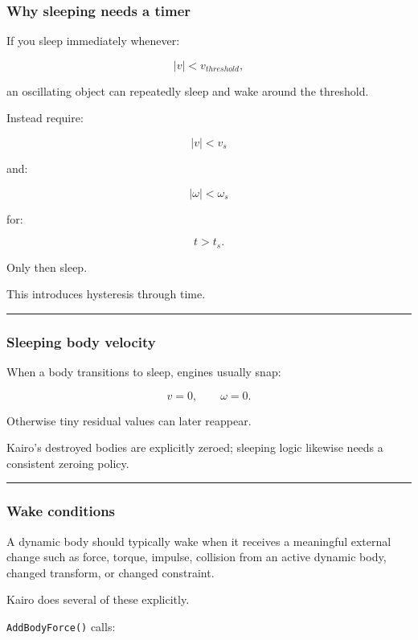 \subsubsection{Why sleeping needs a timer}\label{why-sleeping-needs-a-timer}

If you sleep immediately whenever:

\[
|v|<v_{threshold},
\]

an oscillating object can repeatedly sleep and wake around the threshold.

Instead require:

\[
|v|<v_s
\]

and:

\[
|\omega|<\omega_s
\]

for:

\[
t>t_s.
\]

Only then sleep.

This introduces hysteresis through time.

\begin{center}\rule{0.5\linewidth}{0.5pt}\end{center}

\subsubsection{Sleeping body velocity}\label{sleeping-body-velocity}

When a body transitions to sleep, engines usually snap:

\[
v=0,
\qquad
\omega=0.
\]

Otherwise tiny residual values can later reappear.

Kairo's destroyed bodies are explicitly zeroed; sleeping logic likewise needs a consistent zeroing policy.

\begin{center}\rule{0.5\linewidth}{0.5pt}\end{center}

\subsubsection{Wake conditions}\label{wake-conditions}

A dynamic body should typically wake when it receives a meaningful external change such as force, torque, impulse, collision from an active dynamic body, changed transform, or changed constraint.

Kairo does several of these explicitly.

\texttt{AddBodyForce()} calls:

